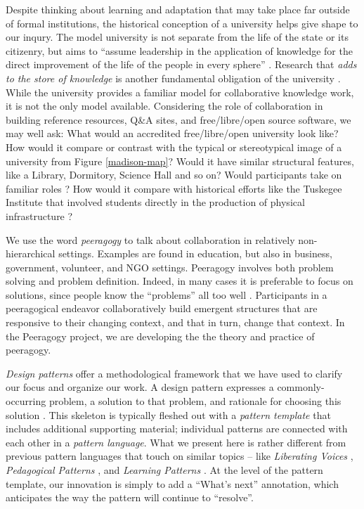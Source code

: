 Despite thinking about learning and adaptation that
may take place far outside of formal institutions, the historical
conception of a university helps give shape to our inqury.
%
The model university is not separate from the life of the state or its
citizenry, but aims to ``assume leadership in the application of
knowledge for the direct improvement of the life of the people in
every sphere'' \cite[p.~88]{curti1949university}. Research that
\emph{adds to the store of knowledge} is another fundamental
obligation of the university \cite[p.~550]{curti1949university}.
While the university provides a familiar model for collaborative
knowledge work, it is not the only model available.
Considering the role of collaboration in building reference resources,
Q\&A sites, and free\slash libre\slash open source software, we may
well ask: What would an accredited free\slash libre\slash open
university look like?  How would it compare or contrast with the
typical or stereotypical image of a university from Figure
\ref{madison-map}?  Would it have similar structural features, like a
Library, Dormitory, Science Hall and so on?  Would participants take
on familiar roles \cite{corneli+crowdsourcing}?  How would it compare
with historical efforts like the Tuskegee Institute that involved
students directly in the production of physical infrastructure
\cite{washington1986up,building-peeragogy-accelerator}?

We use the word \emph{peeragogy} to talk about collaboration in
relatively non-hierarchical settings.  Examples are found in
education, but also in business, government, volunteer, and NGO
settings.  Peeragogy involves both problem solving and problem
definition.  Indeed, in many cases it is preferable to focus on
solutions, since people know the ``problems'' all too well
\cite{ariyaratneXorganizationX1977}.  Participants in a peeragogical
endeavor collaboratively build emergent structures that are responsive
to their changing context, and that in turn, change that context. In
the Peeragogy project, we are developing the the theory and practice
of peeragogy.

\emph{Design patterns} offer a methodological framework that we have
used to clarify our focus and organize our work.  A design pattern
expresses a commonly-occurring problem, a solution to that problem,
and rationale for choosing this solution \cite{meszaros1998pattern}.
This skeleton is typically fleshed out with a \emph{pattern template}
that includes additional supporting material; individual patterns are
connected with each other in a \emph{pattern language}.  What we
present here is rather different from previous pattern languages that touch
on similar topics -- like \emph{Liberating Voices}
\cite{schuler2008liberating}, \emph{Pedagogical Patterns}
\cite{bergin2012pedagogical}, and \emph{Learning Patterns}
\cite{iba2014learning}.  At the level of the pattern template, our
innovation is simply to add a ``What's next'' annotation, which
anticipates the way the pattern will continue to ``resolve''.


